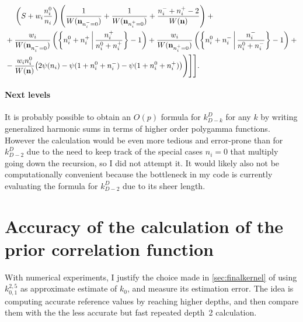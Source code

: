 \documentclass[a4paper]{article}
\theoremstyle{definition}
\begin{document}
\begin{align}
                & \phantom{{}+{}}
                \left(S + w_i \frac {n^0_i} {n_i}\right)
                \left(
                    \frac 1 {W(\mathbf n_{n^-_i=0})} +
                    \frac 1 {W(\mathbf n_{n^+_i=0})} +
                    \frac {n^-_i + n^+_i - 2} {W(\mathbf n)}
                \right)
                + {} \notag \\
                & {} +
                \frac {w_i} {W(\mathbf n_{n^-_i=0})}
                \left(\left\{
                    n^0_i + n^+_i
                    \,\middle|\,
                    \frac {n^+_i} {n^0_i + n^+_i}
                \right\} - 1\right) +
                \frac {w_i} {W(\mathbf n_{n^+_i=0})}
                \left(\left\{
                    n^0_i + n^-_i
                    \,\middle|\,
                    \frac {n^-_i} {n^0_i + n^-_i}
                \right\} - 1\right)
                + {} \notag \\
                & {} -
                \frac {w_i n^0_i} {W(\mathbf n)}
                \big(
                    2\psi(n_i) -
                    \psi(1 + n^0_i + n^-_i) -
                    \psi(1 + n^0_i + n^+_i)
                \big)
        \Bigg)\Bigg]\Bigg]. \notag
    \end{align}

    \paragraph{Next levels} It is probably possible to obtain an $O(p)$ formula for $k^D_{D-k}$ for any $k$ by writing generalized harmonic sums in terms of higher order polygamma functions. However the calculation would be even more tedious and error-prone than for $k^D_{D-2}$ due to the need to keep track of the special cases $n_i = 0$ that multiply going down the recursion, so I did not attempt it. It would likely also not be computationally convenient because the bottleneck in my code is currently evaluating the formula for $k^D_{D-2}$ due to its sheer length.

    \section{Accuracy of the calculation of the prior correlation function}
    \label{sec:interpolation}

    With numerical experiments, I justify the choice made in \autoref{sec:finalkernel} of using $k^{2,5}_{0,1}$ as approximate estimate of $k_0$, and measure its estimation error. The idea is computing accurate reference values by reaching higher depths, and then compare them with the the less accurate but fast repeated depth~2 calculation.
\end{document}
